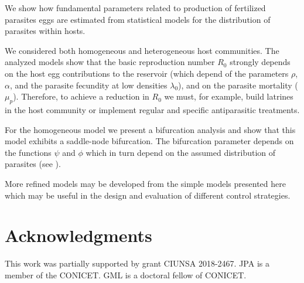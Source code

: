 \documentclass[eng]{MMSB-class-eng}
\begin{document}
We show how fundamental parameters related to production of fertilized parasites eggs are estimated from statistical models for the distribution of
parasites within hosts.	

We considered both homogeneous and heterogeneous host communities. 
The analyzed models show that the basic reproduction number $R_0$ strongly depends 
on the
host egg contributions to the reservoir (which depend of the parameters $\rho$, $\alpha$, and the parasite fecundity at low densities $\lambda_0 $), and on the parasite mortality ($\mu_p$). 
Therefore, to achieve a reduction in $R_0$ we must, for example, build latrines in the host community or implement regular and specific antiparasitic treatments.

For the homogeneous model we present a bifurcation analysis and show that this model exhibits a saddle-node bifurcation.
The bifurcation parameter depends on the functions $\psi$ and $\phi$ which in turn depend on the assumed
distribution of parasites (see \citet{lopez2022general}).

More refined models may be developed from the simple models presented here which may be useful in the design and evaluation of different control strategies. 

\section{Acknowledgments}
This work was partially supported by grant CIUNSA 2018-2467. JPA is a member of the CONICET. GML is a doctoral fellow of CONICET.


\end{document}
